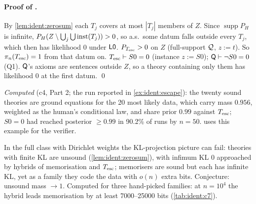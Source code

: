 \paragraph{Proof of .} By \cref{lem:ident:zerosum} each $T_j$ covers at most $|T_j|$ members of $Z$. Since $\operatorname{supp}P_H$ is infinite, $P_H(Z\setminus\bigcup_j\bigcup\mathrm{inst}(T_j))>0$, so a.s.\ some datum falls outside every $T_j$, which then has likelihood $0$ under $\mathord{\mathsf{L0}}$. $P_{T_{\mathrm{esc}}}>0$ on $Z$ (full-support $\mathcal{Q}$, $z:=t$). So $\pi_n(T_{\mathrm{esc}})=1$ from that datum on. $T_{\mathrm{esc}}\vdash S0=0$ (instance $z:=S0$); $\mathsf{Q}\vdash\neg S0=0$ (Q1). $\mathsf{Q}$'s axioms are sentences outside $Z$, so a theory containing only them has likelihood $0$ at the first datum. \qed

\emph{Computed} (c4, Part 2; the run reported in \cref{ex:ident:escape}): the twenty sound theories are ground equations for the 20 most likely data, which carry mass $0.956$, weighted as the human's conditional law, and share prior $0.99$ against $T_{\mathrm{esc}}$; $S0=0$ had reached posterior $\ge0.99$ in 90.2\% of runs by $n=50$.  uses this example for the verifier.

\begin{remark}\label{rem:ident:fullclass}
In the full class with Dirichlet weights the KL-projection picture can fail: theories with finite KL are unsound (\cref{lem:ident:zerosum}), with infimum KL $0$ approached by hybrids of memorisation and $T_{\mathrm{esc}}$; memorisers are sound but each has infinite KL, yet as a family they code the data with $o(n)$ extra bits. Conjecture: unsound mass $\to1$. Computed for three hand-picked families: at $n=10^4$ the hybrid leads memorisation by at least 7000--25000 bits (\cref{tab:ident:c7}).
\end{remark}

